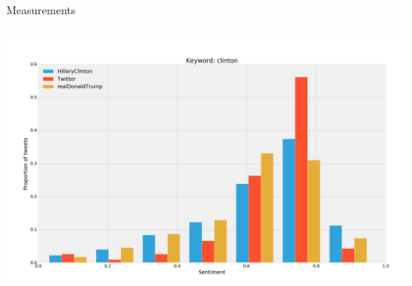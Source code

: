 \documentclass{beamer}
\begin{document}
\begin{frame}[fragile]
\begin{columns}[T]
\begin{column}{.63\textwidth}
\begin{block}{Measurements}
\begin{columns}
            \includegraphics[scale=0.585]{./Pics/hist-clinton.png}
    \end{columns}
\end{block}









\end{column}
\end{columns}
\end{frame}
\end{document}
